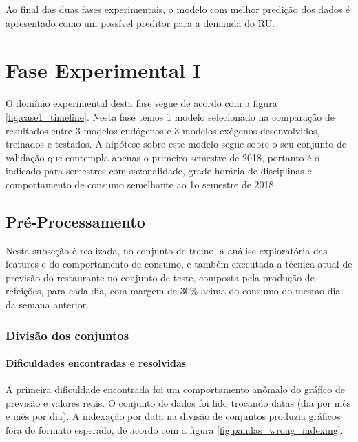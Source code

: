     
    Ao final das duas fases experimentais, o modelo com melhor predição dos dados é apresentado como um possível preditor para a demanda do RU.
     
	\section{Fase Experimental I}
	     \begin{figure}[htb]
        \end{figure}
	    O domínio experimental desta fase segue de acordo com a figura \ref{fig:case1_timeline}.
	    Nesta fase temos 1 modelo selecionado na comparação de resultados entre 3 modelos endógenos e 3 modelos exógenos desenvolvidos, treinados e testados.
	    A hipótese sobre este modelo segue sobre o seu conjunto de validação que contempla apenas o primeiro semestre de 2018, portanto é o indicado para semestres com sazonalidade, grade horária de disciplinas e comportamento de consumo semelhante ao 1o semestre de 2018.
	    
	    \subsection{Pré-Processamento}
	        Nesta subseção é realizada, no conjunto de treino, a análise exploratória das features e do comportamento de consumo, e também executada a técnica atual de previsão do restaurante no conjunto de teste, composta pela produção de refeições, para cada dia, com margem de 30\% acima do consumo do mesmo dia da semana anterior.
    	    \subsubsection{Divisão dos conjuntos}
    	        
    	        \paragraph{Dificuldades encontradas e resolvidas}
    	            A primeira dificuldade encontrada foi um comportamento anômalo do gráfico de previsão e valores reais. O conjunto de dados foi lido trocando datas (dia por mês e mês por dia). A indexação por data na divisão de conjuntos produzia gráficos fora do formato esperado, de acordo com a figura \ref{fig:pandas_wrong_indexing}.
    	            
